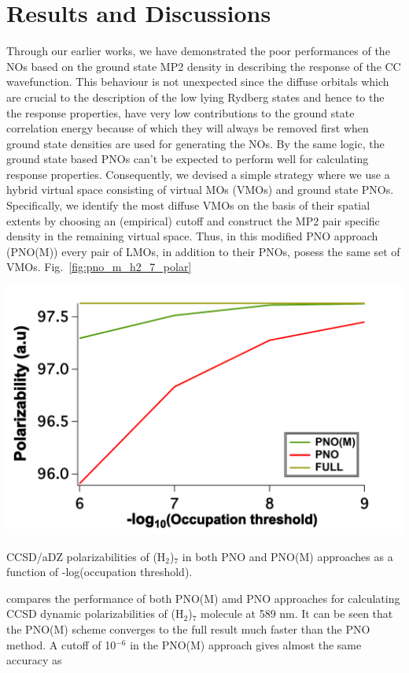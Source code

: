 \section{Results and Discussions}
Through our earlier works\cite{Kumar17,Kumar18:1}, we have demonstrated the poor performances of 
the NOs based on the ground state MP2 density in describing the response 
of the CC wavefunction. This behaviour is not unexpected since the diffuse orbitals
which are crucial to the description of the low lying Rydberg states and hence to the  
the response properties, have very low contributions to the ground state correlation energy
because of which they will always be removed first when ground state densities are used
for generating the NOs. By the same logic, the ground state based PNOs can't be expected to 
perform well for calculating response properties. Consequently, we devised a simple strategy 
where we use a hybrid virtual space consisting of virtual MOs (VMOs) and ground state PNOs. 
Specifically, we identify the most diffuse VMOs on the basis of their spatial extents\cite{Kumar18:1} 
by choosing an (empirical) cutoff and construct the MP2 pair specific density in the remaining  
virtual space. Thus, in this modified PNO approach (PNO(M)) every pair of LMOs, in addition to 
their PNOs, posess the same set of VMOs. 
Fig.~\ref{fig:pno_m_h2_7_polar}
\begin{MyFigure}[h!]
\centering
\includegraphics[width=0.6\linewidth,natwidth=610,natheight=642]{figures_pno++/pno_m_h2_7_adz_polar.pdf}
\caption{{\footnotesize CCSD/aDZ polarizabilities of (H$_2$)$_7$ in both PNO and PNO(M) approaches 
as a function of -log(occupation threshold).}}
\label{fig:pno_m_h2_7_polar}
\end{MyFigure}
compares the performance of both PNO(M) amd PNO approaches for calculating CCSD dynamic polarizabilities of
(H$_2$)$_7$ molecule at 589 nm. It can be seen that the PNO(M) scheme converges to the full result much 
faster than the PNO method. A cutoff of 10$^{-6}$ in the PNO(M) approach gives almost the same accuracy as 
